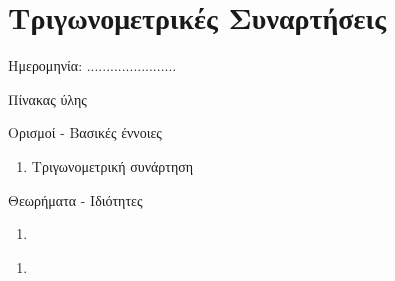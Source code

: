 \documentclass[twoside,nofonts,internet,math,spyros]{frontisthrio}
\newcommand{\myitem}{\stepcounter{enumi}\item[\raisebox{0.5mm}{\faExclamationTriangle}\ \Large$\square$]}
\begin{document}
\section{Τριγωνομετρικές Συναρτήσεις}
\begin{flushright}
\faCalendar* Ημερομηνία: .......................
\end{flushright}
\begin{mybox}[mysubtitle]{Πίνακας ύλης}
\begin{tcbraster}[raster columns=2,raster equal height]
\begin{myleftbox}{Ορισμοί - Βασικές έννοιες\ \ \faBook}
\begin{enumerate}[itemsep=0mm]
\item Τριγωνομετρική συνάρτηση
\end{enumerate}
\end{myleftbox}
\begin{myrightbox}{Θεωρήματα - Ιδιότητες\ \ \faTools}
\begin{enumerate}[itemsep=0mm]
\item 
\end{enumerate}
\end{myrightbox}
\end{tcbraster}
\begin{multicols}{2}
\begin{todolist}[itemsep=0mm]
\myitem 
\end{todolist}
\end{multicols}
\begin{multicols}{2}
\begin{enumerate}[itemsep=0mm]
\item 
\end{enumerate}
\end{multicols}
\end{mybox}
\newpage
\end{document}
